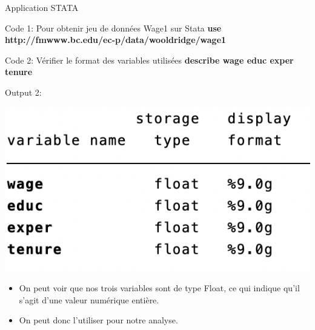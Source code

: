 \documentclass{beamer}
\begin{document}
\begin{frame}{Application STATA}

\begin{block}{Code 1: Pour obtenir jeu de données Wage1 sur Stata}
\textbf{use http://fmwww.bc.edu/ec-p/data/wooldridge/wage1}
\end{block}

\begin{block}{Code 2: Vérifier le format des variables utilisées}
\textbf{describe wage educ exper tenure}
\end{block}

\begin{block}{Output 2:}
\begin{center}
\includegraphics[scale=.5]{describe}
\end{center}
\begin{itemize}
\item On peut voir que nos trois variables sont de type Float, ce qui indique qu'il s'agit d'une valeur numérique entière. 
\item On peut donc l'utiliser pour notre analyse.
\end{itemize}
\end{block}

\end{frame}
\end{document}
